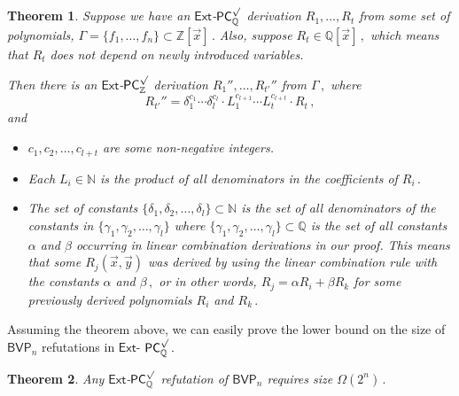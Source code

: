\documentclass[11pt]{article}
\newtheorem{theorem}{Theorem}[section]
\newcommand{\Q}{{\mathbb Q}}
\newcommand{\Z}{{\mathbb Z}}
\begin{document}
\begin{theorem}\label{transaltion-from-z-to-q}
Suppose we have an $\mathsf{Ext}$-$\mathsf{PC}^{\surd}_{\Q}$ derivation
%
%
$R_1, \ldots, R_t$  %
%
%
from some set of polynomials, %
$\Gamma = \{f_1, \ldots, f_n\} \subset \Z[\vec x]\,.$ %
%
%
Also, suppose %
$R_t \in \Q[\vec x]\,,$ %
 which means that $R_t$ does not depend on newly
introduced variables.

Then there is an $\mathsf{Ext}$-$\mathsf{PC}^{\surd}_{\Z}$ derivation
%
$R_1'', \ldots, R_{t'}''$ %
 from  %
$\Gamma\,,$ %
 where
$$
%
R_{t'}'' = \delta_1^{c_{1}} \cdots \delta_l^{c_{l}} \cdot  L_1^{c_{l + 1}} \cdots L_t^{c_{l + t}}  \cdot R_t\,, %
$$ and
\begin{itemize}
    \item $c_1, c_2, \ldots, c_{l + t}$ are some non-negative integers.  
    \item Each $L_i \in \mathbb{N}$ is the product of all denominators in the coefficients of %
$R_i\,.$ %
    \item The set of constants $\{\delta_1, \delta_2, \ldots, \delta_l\} \subset \mathbb{N}$ is the set of all denominators of the constants in $\{\gamma_1, \gamma_2, \ldots, \gamma_l\}$ where  $\{\gamma_1, \gamma_2, \ldots, \gamma_l\} \subset \Q$ is the set of all constants $\alpha$ and $\beta$ occurring in linear combination derivations in our proof. This means that some $R_j(\vec x, \vec y)$ was derived by using the linear combination rule with the constants $\alpha$ and %
$\beta\,,$ %
 or in other words, $R_j = \alpha R_i + \beta R_k$ for some previously derived polynomials $R_i$ and %
$R_k\,.$ %
\end{itemize}


\end{theorem}

%
Assuming the theorem above, we can easily prove the lower bound on the size of $\mathsf{BVP}_n$ refutations in $\mathsf{Ext}$-%
$\mathsf{PC}^{\surd}_{\Q}\,.$ %
%


\begin{theorem}\label{lower bound q}
Any $\mathsf{Ext}$-$\mathsf{PC}^{\surd}_{\Q}$ refutation of $\mathsf{BVP}_n$  requires size %
$\Omega(2^n)\,.$ %
\end{theorem} 
\end{document}
